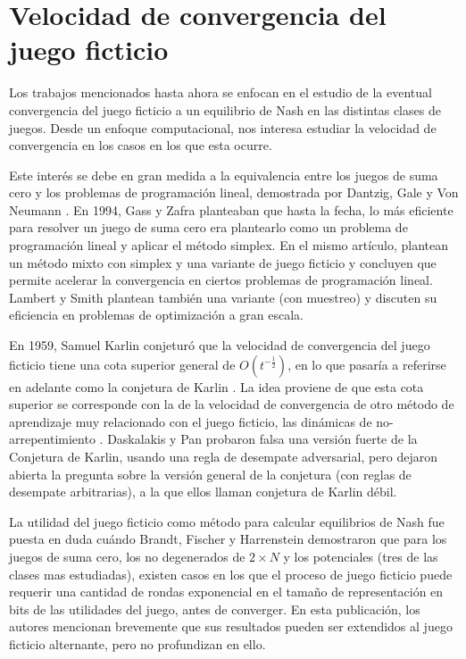 \section{Velocidad de convergencia del juego ficticio}

Los trabajos mencionados hasta ahora se enfocan en el estudio de la eventual convergencia del juego ficticio a un equilibrio de Nash en las distintas clases de juegos. Desde un enfoque computacional, nos interesa estudiar la velocidad de convergencia en los casos en los que esta ocurre.

Este interés se debe en gran medida a la equivalencia entre los juegos de suma cero y los problemas de programación lineal, demostrada por Dantzig, Gale y Von Neumann \cite{fplp:equiv, programming:game:equivalence}. En 1994, Gass y Zafra \cite{modified:fp:linear} planteaban que hasta la fecha, lo más eficiente para resolver un juego de suma cero era plantearlo como un problema de programación lineal y aplicar el método simplex. En el mismo artículo, plantean un método mixto con simplex y una variante de juego ficticio y concluyen que permite acelerar la convergencia en ciertos problemas de programación lineal. Lambert y Smith \cite{aproach:large:scale} plantean también una variante (con muestreo) y discuten su eficiencia en problemas de optimización a gran escala.

En 1959, Samuel Karlin conjeturó que la velocidad de convergencia del juego ficticio tiene una cota superior general de $O(t^{-\frac{1}{2}})$, en lo que pasaría a referirse en adelante como la conjetura de Karlin \cite{karlin:conjecture}. La idea proviene de que esta cota superior se corresponde con la de la velocidad de convergencia de otro método de aprendizaje muy relacionado con el juego ficticio, las dinámicas de no-arrepentimiento \cite{no:regret}. Daskalakis y Pan \cite{counter:karlin:strong} probaron falsa una versión fuerte de la Conjetura de Karlin, usando una regla de desempate adversarial, pero dejaron abierta la pregunta sobre la versión general de la conjetura (con reglas de desempate arbitrarias), a la que ellos llaman conjetura de Karlin débil.

La utilidad del juego ficticio como método para calcular equilibrios de Nash fue puesta en duda cuándo Brandt, Fischer y Harrenstein \cite{brandt:rate:convergence} demostraron que para los juegos de suma cero, los no degenerados de $2 \times N$ y los potenciales (tres de las clases mas estudiadas), existen casos en los que el proceso de juego ficticio puede requerir una cantidad de rondas exponencial en el tamaño de representación en bits de las utilidades del juego, antes de converger. En esta publicación, los autores mencionan brevemente que sus resultados pueden ser extendidos al juego ficticio alternante, pero no profundizan en ello.